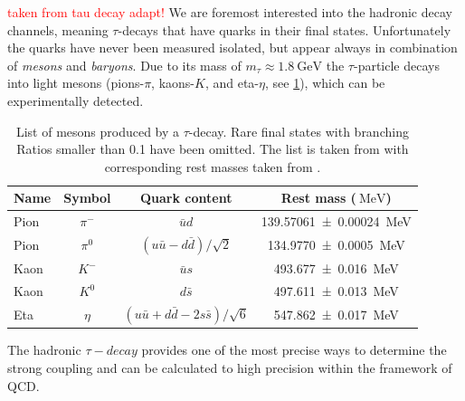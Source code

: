 \documentclass[../../index.tex]{subfiles}
\begin{document}
\textcolor{red}{taken from tau decay adapt!} We are foremost interested into the
hadronic decay channels, meaning $\tau$-decays that have quarks in their final
states. Unfortunately the quarks have never been measured isolated, but appear
always in combination of \textit{mesons} and \textit{baryons}. Due to its mass
of $m_\tau \approx \SI{1.8}{\giga\electronvolt}$ the $\tau$-particle decays into
light mesons (pions-$\pi$, kaons-$K$, and eta-$\eta$, see
\cref{table:lightMesons}), which can be experimentally detected.
\begin{table}
  \centering
  \begin{tabular}{l c c c}
    \toprule
    Name & Symbol & Quark content & Rest mass ($\SI{}{\mega\electronvolt}$) \\
    \midrule
    Pion & $\pi^-$ & $\bar u d$ & \SI{139.57061 \pm 0.00024}{\mega\electronvolt}  \\
    Pion & $\pi^0$ & $(u \bar u - d \bar d)/\sqrt{2}$ & \SI{134.9770\pm0.0005}{\mega\electronvolt} \\
    Kaon & $K^-$ & $\bar u s$ & \SI{493.677\pm0.016}{\mega\electronvolt} \\
    Kaon & $K^0$ & $d \bar s$ & \SI{497.611\pm0.013}{\mega\electronvolt} \\
    Eta & $\eta$ & $(u \bar u + d \bar d - 2 s \bar s)/\sqrt{6}$ & \SI{547.862\pm0.017}{\mega\electronvolt} \\
  \end{tabular}
  \caption{List of mesons produced by a $\tau$-decay. Rare final states with
    branching Ratios smaller than 0.1 have been omitted. The list is taken from
    \cite{Davier2006} with corresponding rest masses taken from \cite{PDG2018}.}
  \label{table:lightMesons}
\end{table}

The hadronic $\tau-decay$ provides one of the most precise ways to determine the
strong coupling \cite{Pich2016} and can be calculated to high precision within
the framework of QCD.
\end{document}
